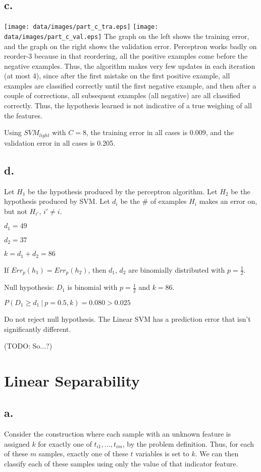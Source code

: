 \documentclass[]{article}
\begin{document}
\subsection{c.}
\texttt{[image: data/images/part\_c\_tra.eps]}
\texttt{[image: data/images/part\_c\_val.eps]}
The graph on the left shows the training error, and the graph on the right shows the validation error. Perceptron works badly on reorder-3 because in that reordering, all the positive examples come before the negative examples. Thus, the algorithm makes very few updates in each iteration (at most 4), since after the first mistake on the first positive example, all examples are classified correctly until the first negative example, and then after a couple of corrections, all subsequent examples (all negative) are all classified correctly. Thus, the hypothesis learned is not indicative of a true weighing of all the features.

Using $SVM_{light}$ with $C=8$, the training error in all cases is 0.009, and the validation error in all cases is 0.205. 

\subsection{d.}
Let $H_1$ be the hypothesis produced by the perceptron algorithm. Let $H_2$ be the hypothesis produced by SVM. Let $d_i$ be the \# of examples $H_i$ makes an error on, but not $H_{i'}$, $i' \neq i$.

$d_1 = 49$

$d_2 = 37$

$k = d_1 + d_2 = 86$

If $Err_p(h_1) = Err_p(h_2)$, then $d_1$, $d_2$ are binomially distributed with $p = \frac{1}{2}$.

Null hypothesis: $D_1$ is binomial with $p=\frac{1}{2}$ and $k=86$.

$P(D_1 \ge d_1~|~p = 0.5, k) = 0.080 > 0.025$

Do not reject null hypothesis. The Linear SVM has a prediction error that isn't significantly different.

(TODO: So...?)

\section{Linear Separability}
\subsection{a.}
Consider the construction where each sample with an unknown feature is assigned $k$ for exactly one of $t_{i1},...,t_{im}$, by the problem definition. Thus, for each of these $m$ samples, exactly one of these $t$ variables is set to $k$. We can then classify each of these samples using only the value of that indicator feature.
\end{document}
